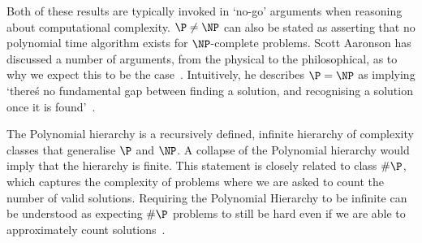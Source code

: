 Both of these results are typically invoked in `no-go' arguments when reasoning about computational complexity. $\P\neq \NP$ can also be stated as asserting that no polynomial time algorithm exists for $\NP$-complete problems. Scott Aaronson has discussed a number of arguments, from the physical to the philosophical, as to why we expect this to be the case~\cite{Aaronson2005,Aaronson2006}. Intuitively, he describes $\P=\NP$ as implying `there\'s no fundamental gap between finding a solution, and recognising a solution once it is found'~\cite{Aaronson2006}.\par
The Polynomial hierarchy is a recursively defined, infinite hierarchy of complexity classes that generalise $\P$ and $\NP$. A collapse of the Polynomial hierarchy would imply that the hierarchy is finite. This statement is closely related to class $\#\P$, which captures the complexity of problems where we are asked to count the number of valid solutions. Requiring the Polynomial Hierarchy to be infinite can be understood as expecting $\#\P$ problems to still be hard even if we are able to approximately count solutions~\cite{Dalzell2017}.
